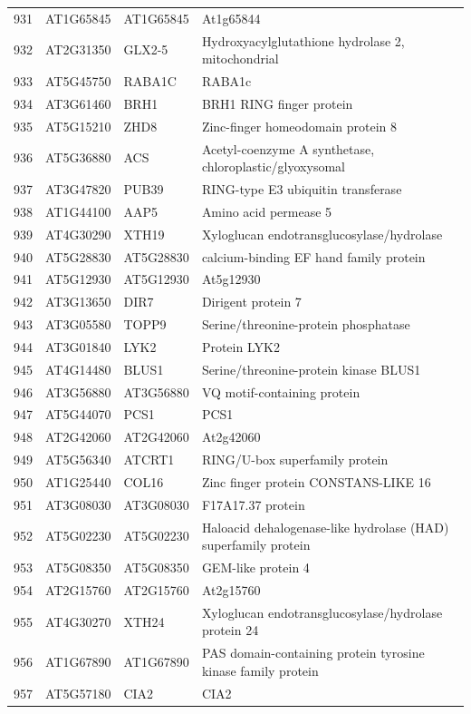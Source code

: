 \documentclass[11pt]{article}
\begin{document}
\begin{center}
\begin{tabular}{rlll}
931 & AT1G65845 & AT1G65845 & At1g65844\\
932 & AT2G31350 & GLX2-5 & Hydroxyacylglutathione hydrolase 2, mitochondrial\\
933 & AT5G45750 & RABA1C & RABA1c\\
934 & AT3G61460 & BRH1 & BRH1 RING finger protein\\
935 & AT5G15210 & ZHD8 & Zinc-finger homeodomain protein 8\\
936 & AT5G36880 & ACS & Acetyl-coenzyme A synthetase, chloroplastic/glyoxysomal\\
937 & AT3G47820 & PUB39 & RING-type E3 ubiquitin transferase\\
938 & AT1G44100 & AAP5 & Amino acid permease 5\\
939 & AT4G30290 & XTH19 & Xyloglucan endotransglucosylase/hydrolase\\
940 & AT5G28830 & AT5G28830 & calcium-binding EF hand family protein\\
941 & AT5G12930 & AT5G12930 & At5g12930\\
942 & AT3G13650 & DIR7 & Dirigent protein 7\\
943 & AT3G05580 & TOPP9 & Serine/threonine-protein phosphatase\\
944 & AT3G01840 & LYK2 & Protein LYK2\\
945 & AT4G14480 & BLUS1 & Serine/threonine-protein kinase BLUS1\\
946 & AT3G56880 & AT3G56880 & VQ motif-containing protein\\
947 & AT5G44070 & PCS1 & PCS1\\
948 & AT2G42060 & AT2G42060 & At2g42060\\
949 & AT5G56340 & ATCRT1 & RING/U-box superfamily protein\\
950 & AT1G25440 & COL16 & Zinc finger protein CONSTANS-LIKE 16\\
951 & AT3G08030 & AT3G08030 & F17A17.37 protein\\
952 & AT5G02230 & AT5G02230 & Haloacid dehalogenase-like hydrolase (HAD) superfamily protein\\
953 & AT5G08350 & AT5G08350 & GEM-like protein 4\\
954 & AT2G15760 & AT2G15760 & At2g15760\\
955 & AT4G30270 & XTH24 & Xyloglucan endotransglucosylase/hydrolase protein 24\\
956 & AT1G67890 & AT1G67890 & PAS domain-containing protein tyrosine kinase family protein\\
957 & AT5G57180 & CIA2 & CIA2\\

\end{tabular}
\end{center}
\end{document}
